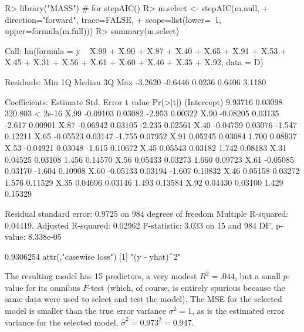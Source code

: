 \documentclass[
]{jss}
\begin{document}
\begin{CodeChunk}
\begin{CodeInput}
R> library("MASS")  # for stepAIC()
R> m.select <- stepAIC(m.null,
+                     direction="forward", trace=FALSE,
+                     scope=list(lower=~1, upper=formula(m.full)))
R> summary(m.select)
\end{CodeInput}
\begin{CodeOutput}

Call:
lm(formula = y ~ X.99 + X.90 + X.87 + X.40 + X.65 + X.91 + X.53 + 
    X.45 + X.31 + X.56 + X.61 + X.60 + X.46 + X.35 + X.92, data = D)

Residuals:
    Min      1Q  Median      3Q     Max 
-3.2620 -0.6446  0.0236  0.6406  3.1180 

Coefficients:
            Estimate Std. Error t value Pr(>|t|)
(Intercept)  9.93716    0.03098 320.803  < 2e-16
X.99        -0.09103    0.03082  -2.953  0.00322
X.90        -0.08205    0.03135  -2.617  0.00901
X.87        -0.06942    0.03105  -2.235  0.02561
X.40        -0.04759    0.03076  -1.547  0.12211
X.65        -0.05523    0.03147  -1.755  0.07952
X.91         0.05245    0.03084   1.700  0.08937
X.53        -0.04921    0.03048  -1.615  0.10672
X.45         0.05543    0.03182   1.742  0.08183
X.31         0.04525    0.03108   1.456  0.14570
X.56         0.05433    0.03273   1.660  0.09723
X.61        -0.05085    0.03170  -1.604  0.10908
X.60        -0.05133    0.03194  -1.607  0.10832
X.46         0.05158    0.03272   1.576  0.11529
X.35         0.04696    0.03146   1.493  0.13584
X.92         0.04430    0.03100   1.429  0.15329

Residual standard error: 0.9725 on 984 degrees of freedom
Multiple R-squared:  0.04419,   Adjusted R-squared:  0.02962 
F-statistic: 3.033 on 15 and 984 DF,  p-value: 8.338e-05
\end{CodeOutput}
\begin{CodeOutput}
[1] 0.9306254
attr(,"casewise loss")
[1] "(y - yhat)^2"
\end{CodeOutput}
\end{CodeChunk}

The resulting model has 15 predictors, a very modest \(R^2 = .044\), but
a small \(p\)-value for its omnibus \(F\)-test (which, of course, is
entirely spurious because the same data were used to select and test the
model). The MSE for the selected model is smaller than the true error
variance \(\sigma^2 = 1\), as is the estimated error variance for the
selected model, \(\widehat{\sigma}^2 = 0.973^2 = 0.947\).
\end{document}
